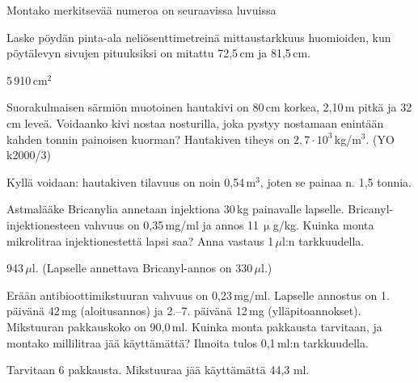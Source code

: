 \begin{tehtavasivu}
\begin{tehtava}
Montako merkitsevää numeroa on seuraavissa luvuissa
\begin{alakohdat}
\end{alakohdat}
\begin{vastaus}
\begin{alakohdat}
\end{alakohdat}
\end{vastaus}
\end{tehtava}


\begin{tehtava}
Laske pöydän pinta-ala neliösenttimetreinä mittaustarkkuus huomioiden, kun pöytälevyn sivujen pituuksiksi on mitattu 72,5\,cm ja 81,5\,cm.
\begin{vastaus}
5\,910\,cm$^2$
\end{vastaus}
\end{tehtava}

\begin{tehtava}
Suorakulmaisen särmiön muotoinen hautakivi on 80\,cm korkea, 2,10\,m pitkä ja 32\,cm leveä.
Voidaanko kivi nostaa nosturilla, joka pystyy nostamaan enintään kahden tonnin painoisen kuorman? Hautakiven tiheys on $2,7 \cdot 10^3$\,kg/m$^3$. (YO k2000/3)
\begin{vastaus}
Kyllä voidaan: hautakiven tilavuus on noin 0,54\,m$^3$, joten se painaa n. 1,5 tonnia.
\end{vastaus}
\end{tehtava}

\begin{tehtava}
Astmalääke Bricanylia annetaan injektiona 30\,kg painavalle lapselle. Bricanyl-injektionesteen vahvuus on 0,35\,mg/ml ja annos 11\,$\upmu$g/kg. Kuinka monta mikrolitraa injektionestettä lapsi saa? Anna vastaus 1\,$\mu$l:n tarkkuudella.
 \begin{vastaus}
943\,$\mu$l. (Lapselle annettava Bricanyl-annos on 330\,$\mu$l.)
 \end{vastaus}
\end{tehtava}

\begin{tehtava}
Erään antibioottimikstuuran vahvuus on 0,23\,mg/ml. Lapselle annostus on 1. päivänä 42\,mg (aloitusannos) 
ja 2.--7. päivänä 12\,mg (ylläpitoannokset). Mikstuuran pakkauskoko on 90,0\,ml. Kuinka monta pakkausta tarvitaan, ja montako millilitraa jää käyttämättä? Ilmoita tulos 0,1\,ml:n tarkkuudella.
 \begin{vastaus}
Tarvitaan 6 pakkausta. Mikstuuraa jää käyttämättä 44,3 ml.
 \end{vastaus}
\end{tehtava}


\end{tehtavasivu}
